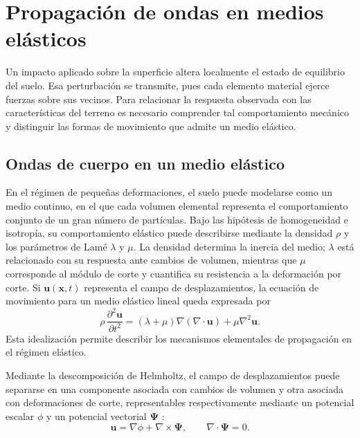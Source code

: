 \section{Propagación de ondas en medios elásticos}
\label{sec:fundamentos}

Un impacto aplicado sobre la superficie altera localmente el estado de equilibrio del suelo. Esa perturbación se transmite, pues cada elemento material ejerce fuerzas sobre sus vecinos. Para relacionar la respuesta observada con las características del terreno es necesario comprender tal comportamiento mecánico y distinguir las formas de movimiento que admite un medio elástico.

\subsection{Ondas de cuerpo en un medio elástico}
\label{sec:medio-elastico}

En el régimen de pequeñas deformaciones, el suelo puede modelarse como un medio continuo, en el que cada volumen elemental representa el comportamiento conjunto de un gran número de partículas. Bajo las hipótesis de homogeneidad e isotropía, su comportamiento elástico puede describirse mediante la densidad $\rho$ y los parámetros de Lamé $\lambda$ y $\mu$. La densidad determina la inercia del medio; $\lambda$ está relacionado con su respuesta ante cambios de volumen, mientras que $\mu$ corresponde al módulo de corte y cuantifica su resistencia a la deformación por corte. Si $\mathbf{u}(\mathbf{x},t)$ representa el campo de desplazamientos, la ecuación de movimiento para un medio elástico lineal queda expresada por \citep{Kramer1996,Foti2014}
\begin{equation}
\rho\,\frac{\partial^2\mathbf{u}}{\partial t^2}
=(\lambda+\mu)\nabla(\nabla\!\cdot\!\mathbf{u})+
\mu\nabla^2\mathbf{u}.
\label{eq:navier}
\end{equation}
Esta idealización permite describir los mecanismos elementales de propagación en el régimen elástico.

Mediante la descomposición de Helmholtz, el campo de desplazamientos puede separarse en una componente asociada con cambios de volumen y otra asociada con deformaciones de corte, representables respectivamente mediante un potencial escalar $\phi$ y un potencial vectorial $\mathbf{\Psi}$ \citep{Foti2014}:
\begin{equation}
	\mathbf{u}=\nabla\phi+\nabla\times\mathbf{\Psi},
	\qquad \nabla\cdot\mathbf{\Psi}=0.
	\label{eq:helmholtz}
\end{equation}

